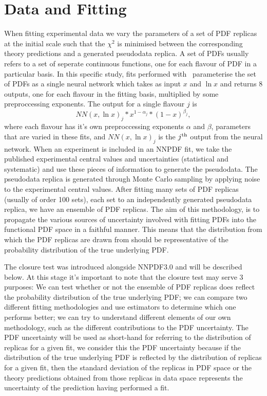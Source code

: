 \section{Data and Fitting}

When fitting experimental data we vary the parameters of a set of PDF replicas
at the initial scale such that the $\chi^2$ is minimised between the
corresponding theory predictions and a generated pseudodata replica. A set of
PDFs usually refers to a set of seperate continuous functions, one for each
flavour of PDF in a particular basis. In this specific study, fits performed
with \nfit\ parameterise the set of PDFs as a single neural network which takes
as input $x$ and $\ln x$ and returns 8 outputs, one for each flavour in the
fitting basis, multiplied by some preproccessing exponents. The output for a
single flavour $j$ is
\begin{equation}
    NN(x, \ln x)_j * x^{1-\alpha_j} * (1-x)^{\beta_j},
\end{equation}
where each flavour has it's own preproccessing exponents $\alpha$ and $\beta$,
parameters that are varied in these fits, and $NN(x, \ln x)_j$ is the
$j^{\rm th}$ output from the neural network.
When an experiment is included in an NNPDF fit, we take the published
experimental central values and uncertainties (statistical and systematic)
and use these pieces of information to generate the pseudodata.
The pseudodata replica is generated
through Monte Carlo sampling by applying noise to the experimental
central values.
After fitting many sets of PDF replicas (usually of order 100 sets),
each set to an independently generated pseudodata replica, we have an ensemble of
PDF replicas.
The aim of this methodology, is to propagate the various sources of
uncertainty involved with fitting PDFs into the functional PDF space in a faithful
manner. This means that the distribution from which the PDF replicas are drawn
from should be representative of the probability distribution of the true
underlying PDF.

The closure test was introduced alongside NNPDF3.0 and will be described below.
At this stage it's important to note that the closure test may serve 3 purposes:
We can test whether or not the ensemble of PDF replicas does reflect the
probability distribution of the true underlying PDF; we can compare two different
fitting methodologies and use estimators to determine which one performs better;
we can try to understand different elements of our own methodology, such as
the different contributions to the PDF uncertainty. The PDF uncertainty will
be used as short-hand for referring to the distribution of replicas for a given
fit, we consider this the PDF uncertainty because if the distribution
of the true underlying PDF is reflected by the distribution of replicas for
a given fit, then the standard deviation of the replicas in PDF space or the
theory predictions obtained from those replicas in data space represents
the uncertainty of the prediction having performed a fit.

